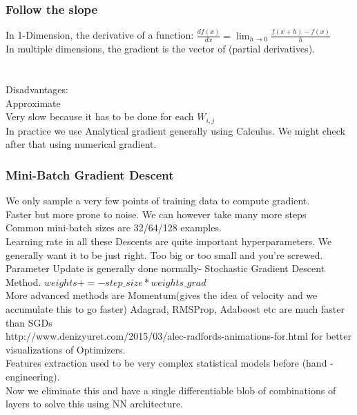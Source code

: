 \documentclass{article}
\begin{document}
\subsubsection{Follow the slope}
In 1-Dimension, the derivative of a function:
$\frac{df(x)}{dx} = \lim_{h\to0} \frac{f(x+h)-f(x)}{h}$
\\In multiple dimensions, the gradient is the vector of (partial derivatives).
\\ 
\\ \\
Disadvantages:
\\Approximate
\\Very slow because it has to be done for each $W_{i,j}$
\\ In practice we use Analytical gradient generally using Calculus. We might check after that using numerical gradient.
\subsubsection{Mini-Batch Gradient Descent}
We only sample a very few points of training data to compute gradient.
\\ Faster but more prone to noise. We can however take many more steps
\\Common mini-batch sizes are 32/64/128 examples.
\\ Learning rate in all these Descents are quite important hyperparameters. We generally want it to be just right. Too big or too small and you're screwed.
\\ Parameter Update is generally done normally- Stochastic Gradient Descent Method.
$weights += -step\_size * weights\_grad$
\\ More advanced methods are Momentum(gives the idea of velocity and we accumulate this to go faster) Adagrad, RMSProp, Adaboost etc are much faster than SGDs
\\ http://www.denizyuret.com/2015/03/alec-radfords-animations-for.html for better visualizations of Optimizers.
\\ Features extraction used to be very complex statistical models before (hand -engineering).
\\ Now we eliminate this and have a single differentiable blob of combinations of layers to solve this using NN architecture.
\end{document}
